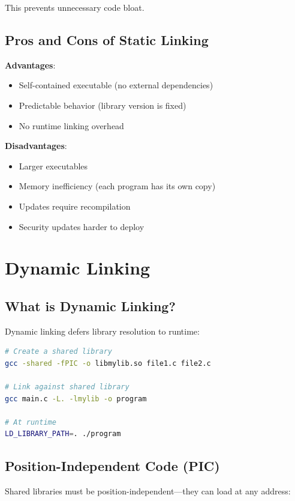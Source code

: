 This prevents unnecessary code bloat.

\subsection{Pros and Cons of Static Linking}

\textbf{Advantages}:
\begin{itemize}
    \item Self-contained executable (no external dependencies)
    \item Predictable behavior (library version is fixed)
    \item No runtime linking overhead
\end{itemize}

\textbf{Disadvantages}:
\begin{itemize}
    \item Larger executables
    \item Memory inefficiency (each program has its own copy)
    \item Updates require recompilation
    \item Security updates harder to deploy
\end{itemize}

\section{Dynamic Linking}

\subsection{What is Dynamic Linking?}

Dynamic linking defers library resolution to runtime:

\begin{lstlisting}[language=bash]
# Create a shared library
gcc -shared -fPIC -o libmylib.so file1.c file2.c

# Link against shared library
gcc main.c -L. -lmylib -o program

# At runtime
LD_LIBRARY_PATH=. ./program
\end{lstlisting}

\subsection{Position-Independent Code (PIC)}

Shared libraries must be position-independent—they can load at any address:

